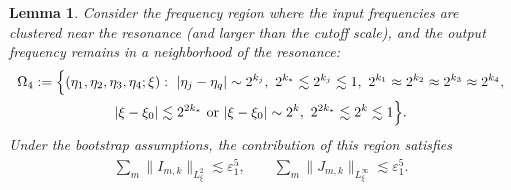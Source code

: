 \documentclass[reqno,english,11pt]{amsart}
\newcommand{\eps}{\varepsilon}
\newtheorem{lemma}[theorem]{Lemma}
\theoremstyle{definition}
\numberwithin{equation}{section}
\begin{document}
\begin{lemma}
\label{prop:secondary_resonance}
Consider the frequency region where the input frequencies are clustered near the resonance (and larger than the cutoff scale), and the output frequency remains in a neighborhood of the resonance:
\begin{multline}\label{eq:Omega_4}
\Omega_4
:=\Bigl\{(\eta_1,\eta_2,\eta_3,\eta_4;\xi):\ 
|\eta_j-\eta_q|\sim 2^{k_j},\ 2^{k_*}\lesssim 2^{k_j}\lesssim 1,\ 
2^{k_1}\approx 2^{k_2}\approx 2^{k_3}\approx 2^{k_4},\\ 
|\xi-\xi_0|\lesssim 2^{2k_*}\ \text{or}\ |\xi-\xi_0|\sim 2^k,\ 2^{2k_*}\lesssim 2^k\lesssim 1
\Bigr\}.
\end{multline}
Under the bootstrap assumptions, the contribution of this region satisfies
\begin{align}
    \sum_{m} \|I_{m,k}\|_{L^2_\xi} \lesssim \eps_1^5, \qquad
    \sum_{m} \|J_{m,k}\|_{L^\infty_\xi} \lesssim \eps_1^5.
\end{align}
\end{lemma}
\end{document}
